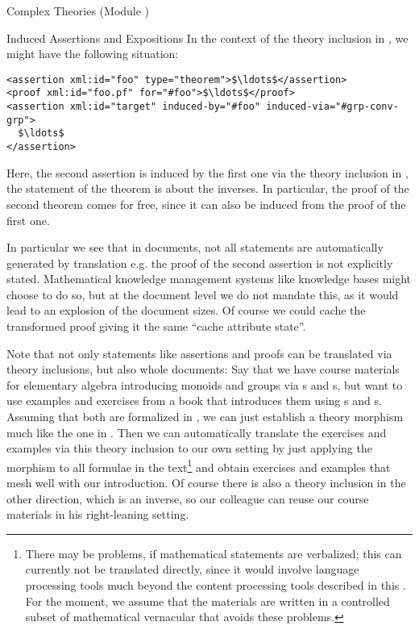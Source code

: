 \begin{tchapter}[id=complex-theories,short=Complex Theories]{Complex Theories (Module
    )}
\begin{tsection}[id=induced-assertions,short=Induced Assertions]{Induced Assertions and Expositions}
  In the context of the theory inclusion in , we
  might have the following situation:
\begin{lstlisting}[label=lst:assertion-translation,mathescape,
  caption={Translating a Statement via a Theory Inclusion},
  index={translated-from,translated-via}]
<assertion xml:id="foo" type="theorem">$\ldots$</assertion>
<proof xml:id="foo.pf" for="#foo">$\ldots$</proof>
<assertion xml:id="target" induced-by="#foo" induced-via="#grp-conv-grp"> 
  $\ldots$
</assertion>
\end{lstlisting}
Here, the second assertion is induced by the first one via the theory inclusion in
, the statement of the theorem is about the inverses.  In
particular, the proof of the second theorem comes for free, since it can also be induced
from the proof of the first one.

In particular we see that in \omdoc documents, not all statements are automatically
generated by translation e.g. the proof of the second assertion is not explicitly stated.
Mathematical knowledge management systems like knowledge bases might choose to do so, but
at the document level we do not mandate this, as it would lead to an explosion of the
document sizes. Of course we could cache the transformed proof giving it the same ``cache
attribute state''.

Note that not only statements like assertions and proofs can be translated via theory
inclusions, but also whole documents: Say that we have course materials for elementary
algebra introducing monoids and groups via s and
s, but want to use examples and exercises from a book that
introduces them using s and s. Assuming
that both are formalized in \omdoc, we can just establish a theory morphism much like
the one in . Then we can automatically translate the
exercises and examples via this theory inclusion to our own setting by just applying the
morphism to all formulae in the text\footnote{There may be problems, if mathematical
  statements are verbalized; this can currently not be translated directly, since it would
  involve language processing tools much beyond the content processing tools described in
  this {\report}. For the moment, we assume that the materials are written in a controlled
  subset of mathematical vernacular that avoids these problems.}  and obtain exercises and
examples that mesh well with our introduction. Of course there is also a theory inclusion
in the other direction, which is an inverse, so our colleague can reuse our course
materials in his right-leaning setting.


\end{tsection}
\end{tchapter}
